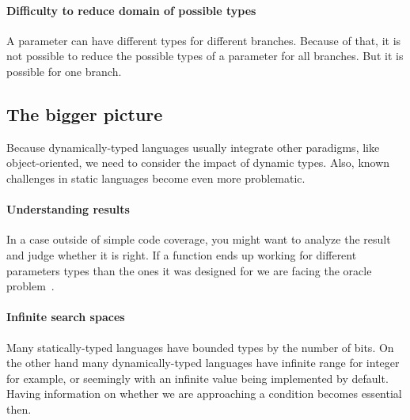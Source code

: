 \documentclass{llncs2e/llncs}
\begin{document}

\paragraph{Difficulty to reduce domain of possible types} A parameter can have
different types for different branches. Because of that, it is not possible to
reduce the possible types of a parameter for all branches. But it is possible
for one branch.

\subsection{The bigger picture}
Because dynamically-typed languages usually integrate other paradigms, like
object-oriented, we need to consider the impact of dynamic types. Also, known
challenges in static languages become even more problematic.

\paragraph{Understanding results} In a case outside of simple code coverage, you
might want to analyze the result and judge whether it is right. If a function
ends up working for different parameters types than the ones it was designed for
we are facing the oracle problem~\cite{barr2015oracle}.

\paragraph{Infinite search spaces} Many statically-typed languages have bounded
types by the number of bits. On the other hand many dynamically-typed languages
have infinite range for integer for example, or seemingly with an infinite value
being implemented by default. Having information on whether we are approaching a
condition becomes essential then.
\end{document}
